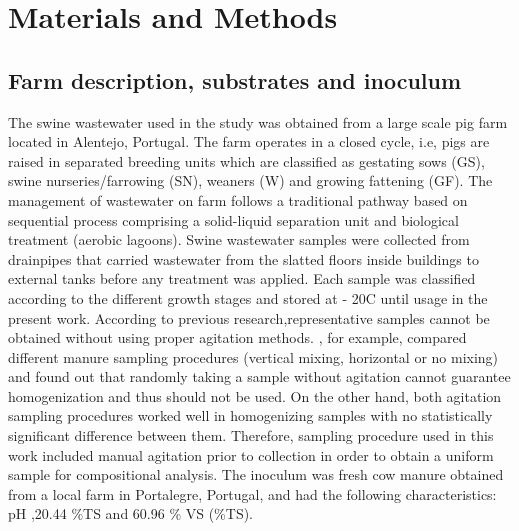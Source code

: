 \section{Materials and Methods}
\subsection{Farm description, substrates and inoculum}
The swine wastewater used in the study was obtained from a large scale pig farm located in Alentejo, Portugal. The farm operates in a closed cycle, i.e, pigs are raised in separated breeding units which are classified as gestating sows (GS), swine nurseries/farrowing (SN), weaners (W) and growing fattening (GF). The management of wastewater on farm follows a traditional pathway based on sequential process comprising a solid-liquid separation unit and biological treatment (aerobic lagoons). 
Swine wastewater samples were collected from drainpipes that carried wastewater from the slatted floors inside buildings to external tanks before any treatment was applied. Each sample was classified according to the different growth stages and stored at - 20\textdegree C until usage in the present work. According to previous research,representative samples cannot be obtained without using proper agitation methods. \cite{Zhu_2004}, for example, compared different manure sampling procedures (vertical mixing, horizontal or no mixing) and found out that randomly taking a sample without agitation cannot guarantee homogenization and thus should not be used. On the other hand, both agitation sampling procedures worked well in homogenizing samples with no statistically significant difference between them.  Therefore, sampling procedure used in this work included manual agitation prior to collection in order to obtain a uniform sample for compositional analysis. The inoculum was fresh cow manure obtained from a local farm in Portalegre, Portugal, and had the following characteristics: pH ,20.44  \%TS and 60.96 \% VS (\%TS).

